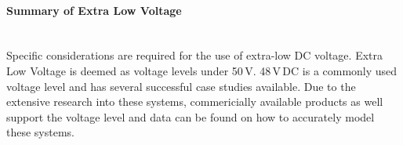 \paragraph{Summary of Extra Low Voltage}
~\\
Specific considerations are required for the use of extra-low DC voltage. Extra Low Voltage is deemed as voltage levels under 50\,V. 48\,V\,DC is a commonly used voltage level and has several successful case studies available. Due to the extensive research into these systems, commericially available products as well support the voltage level and data can be found on how to accurately model these systems. 


\newpage